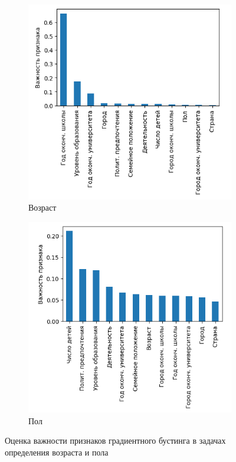 \begin{figure}[h!]
\begin{subfigure}[h]{0.5\linewidth}
\includegraphics[width=\linewidth]{images/xgb_age_feature_importance}
\caption{Возраст}
\end{subfigure}
\hfill
\begin{subfigure}[h]{0.5\linewidth}
\includegraphics[width=\linewidth]{images/xgb_gender_feature_importance.png}
\caption{Пол}
\end{subfigure}%
\caption{Оценка важности признаков градиентного бустинга в задачах определения возраста и пола}
\label{fig:xgb_feature_importace}
\end{figure}

